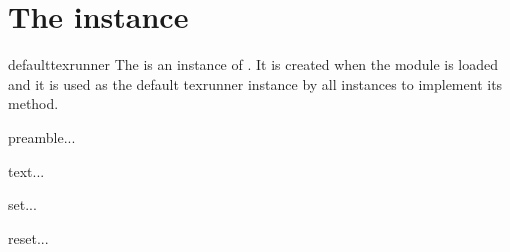 \section{The  instance}

\begin{datadesc}{defaulttexrunner}
  The  is an instance of . It
  is created when the  module is loaded and it is used as
  the default texrunner instance by all  instances to
  implement its  method.
\end{datadesc}

\begin{funcdesc}{preamble}{...}
\end{funcdesc}

\begin{funcdesc}{text}{...}
\end{funcdesc}

\begin{funcdesc}{set}{...}
\end{funcdesc}

\begin{funcdesc}{reset}{...}
\end{funcdesc}
